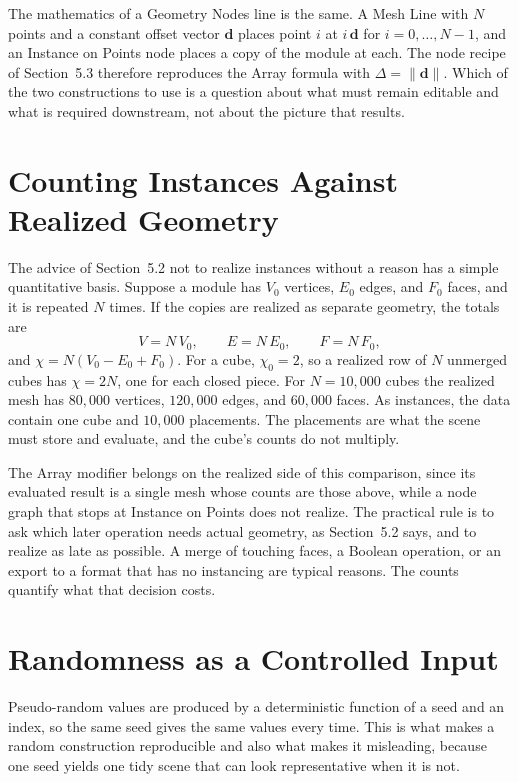 The mathematics of a Geometry Nodes line is the same. A Mesh Line with $N$ points and a constant offset vector $\mathbf d$ places point $i$ at $i\,\mathbf d$ for $i=0,\dots,N-1$, and an Instance on Points node places a copy of the module at each. The node recipe of Section~5.3 therefore reproduces the Array formula with $\Delta=\|\mathbf d\|$. Which of the two constructions to use is a question about what must remain editable and what is required downstream, not about the picture that results.

\section{Counting Instances Against Realized Geometry}

The advice of Section~5.2 not to realize instances without a reason has a simple quantitative basis. Suppose a module has $V_0$ vertices, $E_0$ edges, and $F_0$ faces, and it is repeated $N$ times. If the copies are realized as separate geometry, the totals are
\[
  V=N\,V_0,\qquad E=N\,E_0,\qquad F=N\,F_0,
\]
and $\chi=N(V_0-E_0+F_0)$. For a cube, $\chi_0=2$, so a realized row of $N$ unmerged cubes has $\chi=2N$, one for each closed piece. For $N=10{,}000$ cubes the realized mesh has $80{,}000$ vertices, $120{,}000$ edges, and $60{,}000$ faces. As instances, the data contain one cube and $10{,}000$ placements. The placements are what the scene must store and evaluate, and the cube's counts do not multiply.

The Array modifier belongs on the realized side of this comparison, since its evaluated result is a single mesh whose counts are those above, while a node graph that stops at Instance on Points does not realize. The practical rule is to ask which later operation needs actual geometry, as Section~5.2 says, and to realize as late as possible. A merge of touching faces, a Boolean operation, or an export to a format that has no instancing are typical reasons. The counts quantify what that decision costs.

\section{Randomness as a Controlled Input}

Pseudo-random values are produced by a deterministic function of a seed and an index, so the same seed gives the same values every time. This is what makes a random construction reproducible and also what makes it misleading, because one seed yields one tidy scene that can look representative when it is not.

